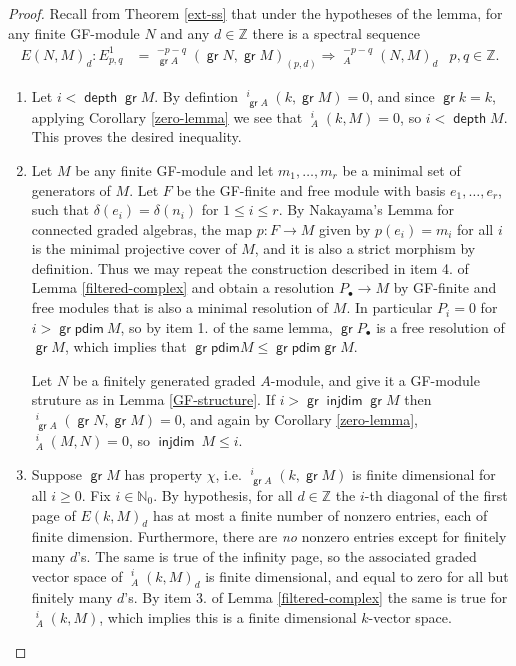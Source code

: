\documentclass[11pt,fleqn]{article}
\theoremstyle{plain}
\theoremstyle{remark}
\theoremstyle{definition}
\newcommand\NN{\mathbb N}
\newcommand\ZZ{\mathbb Z}
\renewcommand\to{\longrightarrow}
\newcommand\pdim{\mathsf{pdim}}
\DeclareMathOperator\GrExt{\underline{\mathsf{Ext}}}
\DeclareMathOperator\gr{\mathsf{gr}}
\DeclareMathOperator\injdim{\mathsf{injdim}}
\DeclareMathOperator\depth{\mathsf{depth}}
\begin{document}
\begin{proof} Recall from Theorem \ref{ext-ss} that under the hypotheses of the lemma, for
	any finite GF-module $N$ and any $d \in \ZZ$ there is a spectral sequence 
	\begin{align*}
	E(N,M)_d: E^1_{p,q} &= \GrExt_{\gr A}^{-p-q}(\gr N, \gr M)_{(p,d)} \Rightarrow
	\GrExt_A^{-p-q}(N,M)_d & p,q \in \ZZ.
	\end{align*}

	\begin{enumerate}
	\item Let $i < \depth \gr M$. By defintion $\GrExt^i_{\gr A}(k,\gr M) = 0$,
	and since $\gr k = k$, applying Corollary \ref{zero-lemma} we see that
	$\GrExt_A^i(k,M) = 0$, so $i < \depth M$. This proves the desired inequality.

	\item Let $M$ be any finite GF-module and let $m_1, \ldots, m_r$ be a minimal set
	of generators of $M$. Let $F$ be the GF-finite and free module with basis $e_1,
	\ldots, e_r$, such that $\delta(e_i) = \delta(n_i)$ for $1 \leq i \leq r$. By
	Nakayama's Lemma for connected graded algebras, the map $p: F \to M$ given by 
	$p(e_i) = m_i$ for all $i$ is the minimal projective cover of $M$, and it is also 
	a strict morphism by definition. Thus we may repeat the construction described in
	item 4. of Lemma \ref{filtered-complex} and obtain a resolution $P_\bullet \to M$
	by GF-finite and free modules that is also a minimal resolution of $M$. In
	particular $P_i = 0$ for $i > \gr\pdim~M$, so by item 1. of the same lemma, $\gr
	P_\bullet$ is a free resolution of $\gr M$, which implies that $\gr\pdim M \leq
	\gr\pdim \gr M$.
	
	Let $N$ be a finitely generated graded $A$-module, and give it a GF-module
	struture as in Lemma \ref{GF-structure}. If $i > \gr\injdim \gr M$ then
	$\GrExt_{\gr A}^i(\gr N, \gr M) = 0$, and again by Corollary \ref{zero-lemma},
	$\GrExt_A^i(M,N) = 0$, so $\injdim~M \leq i$.
	
	\item Suppose $\gr M$ has property $\chi$, i.e. $\GrExt_{\gr A}^i(k,\gr M)$ is
	finite dimensional for all $i \geq 0$. Fix $i\in \NN_0$. By hypothesis, for all $d
	\in \ZZ$ the $i$-th diagonal of the first page of $E(k,M)_d$ has at most a finite
	number of nonzero entries, each of finite dimension. Furthermore, there are 
	\emph{no} nonzero entries except for finitely many $d$'s. The same is true of the 
	infinity page, so the associated graded vector space of $\GrExt_A^i(k,M)_d$ is
	finite dimensional, and equal to zero for all but finitely many $d$'s. By
	item 3. of Lemma \ref{filtered-complex} the same is true for $\GrExt_A^i(k,M)$,
	which implies this is a finite dimensional $k$-vector space.



\end{enumerate}
\end{proof}
\end{document}
